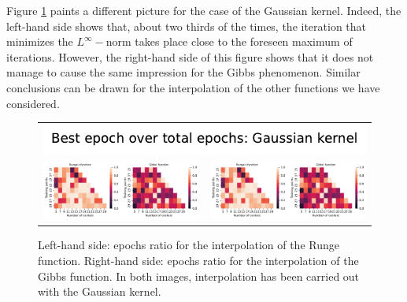 \documentclass[12pt]{report} %
\begin{document}
Figure \ref{fig:epochs-gaussian-kernel-report} paints a different picture for the case of the Gaussian kernel. Indeed, the left-hand side shows that, about two thirds of the times, the iteration that minimizes the $L^\infty-$norm takes place close to the foreseen maximum of iterations. However, the right-hand side of this figure shows that it does not manage to cause the same impression for the Gibbs phenomenon. Similar conclusions can be drawn for the interpolation of the other functions we have considered.

\begin{figure}[h]
  \begin{tabular}{cc}
    \multicolumn{2}{c}{{\includegraphics[width=.5\textwidth]
    {imagenes/experiments/1d/variational/best_epochs_comparison_gaussian_kernel_Title.pdf}}}                                                                                       \\
    {\includegraphics[height=.4\textwidth, trim={0 0 11.5cm 0},clip=true]
    {imagenes/experiments/1d/variational/best_epochs_comparison_gaussian_kernel.pdf}}  &
     {\includegraphics[height=.4\textwidth, trim={9.5cm 0 0 0},clip=true]{imagenes/experiments/1d/variational/best_epochs_comparison_gaussian_kernel.pdf}} \\
  \end{tabular}
  \caption{Left-hand side: epochs ratio for the interpolation of the Runge function. Right-hand side: epochs ratio for the interpolation of the Gibbs function. In both images, interpolation has been carried out with the Gaussian kernel.}
  \label{fig:epochs-gaussian-kernel-report}
\end{figure}
\end{document}
